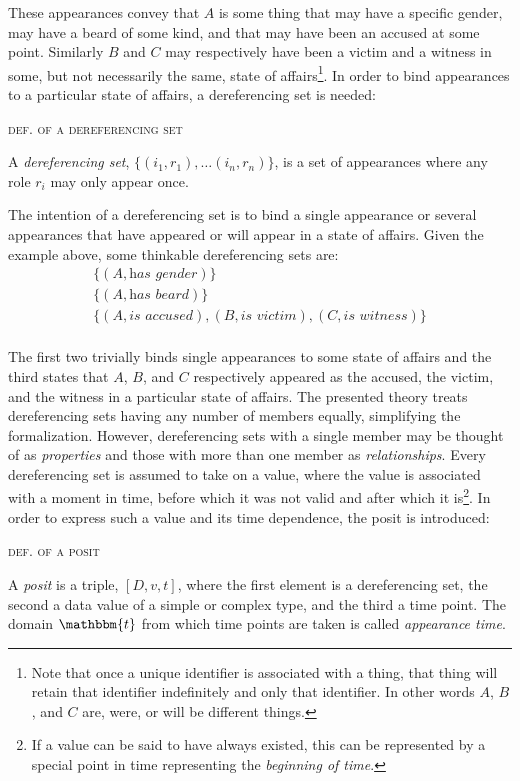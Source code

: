 \documentclass[sfsidenotes,nobib,twoside,symmetric]{tufte-handout}
\newcounter{majorcount}
\newcommand{\deffy}[3]{
	\vspace{2ex}
	\refstepcounter{majorcount} 
	\noindent\textsc{#1}%
	\\\begin{small}
	\noindent #2%
	\label{Def:#3}
	\end{small}
	\vspace{2ex}
}
\begin{document}
These appearances convey that $A$ is some thing that may have a specific gender, may have a beard of some kind, and that may have been an accused at some point. Similarly $B$ and $C$ may respectively have been a victim and a witness in some, but not necessarily the same, state of affairs\footnote[][-22mm]{Note that once a unique identifier is associated with a thing, that thing will retain that identifier indefinitely and only that identifier. In other words $A$, $B$, and $C$ are, were, or will be different things.}. In order to bind appearances to a particular state of affairs, a dereferencing set is needed:

\deffy{def. of a dereferencing set}{%
A \emph{dereferencing set}, $\{(i_1, r_1), \ldots (i_n, r_n)\}$, is a set of appearances where any role $r_i$ may only appear once.}{deref}

The intention of a dereferencing set is to bind a single appearance or several appearances that have appeared or will appear in a state of affairs. Given the example above, some thinkable dereferencing sets are: 
\begin{align*}
\{(A, \textit{has gender})\} \\
\{(A, \textit{has beard})\} \\
\{(A, \textit{is accused}),(B, \textit{is victim}),(C, \textit{is witness})\} \\
\end{align*}

The first two trivially binds single appearances to some state of affairs and the third states that $A$, $B$, and $C$ respectively appeared as the accused, the victim, and the witness in a particular state of affairs. The presented theory treats dereferencing sets having any number of members equally, simplifying the formalization. However, dereferencing sets with a single member may be thought of as \emph{properties} and those with more than one member as \emph{relationships}. Every dereferencing set is assumed to take on a value, where the value is associated with a moment in time, before which it was not valid and after which it is\footnote{If a value can be said to have always existed, this can be represented by a special point in time representing the \emph{beginning of time}.}. In order to express such a value and its time dependence, the posit is introduced:

\deffy{def. of a posit}{%
A \emph{posit} is a triple, $\left[D, v, t\right]$, where the first element is a dereferencing set, the second a data value of a simple or complex type, and the third a time point. The domain $\mathbbm{t}$ from which time points are taken is called \emph{appearance time}.
}{posit}
\end{document}
